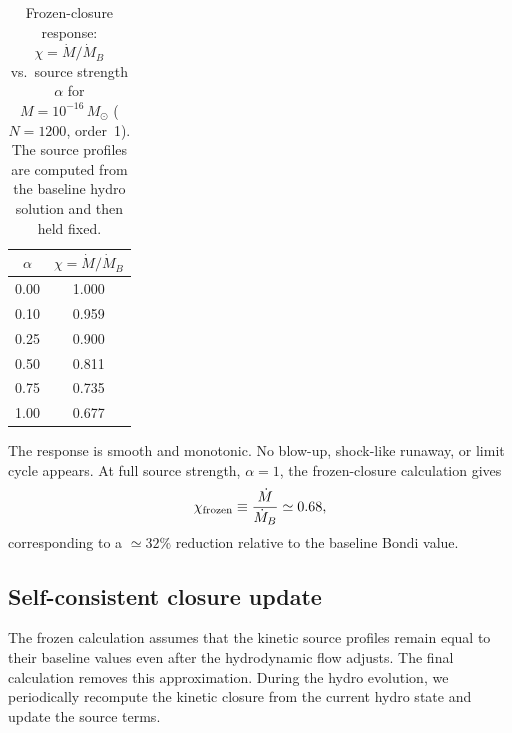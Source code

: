 \documentclass[12pt]{article}
\newcommand{\Msun}{M_\odot}
\newcommand{\Mdot}{\dot{M}}
\newcommand{\MdotB}{\dot{M}_B}
\begin{document}
\begin{table}[h]
\centering
\caption{Frozen-closure response: $\chi = \Mdot/\MdotB$ vs.\ source
  strength $\alpha$ for $M = 10^{-16}\,\Msun$ ($N=1200$, order~1).
  The source profiles are computed from the baseline hydro solution
  and then held fixed.}
\label{tab:alpha}
\begin{tabular}{cc}
\toprule
$\alpha$ & $\chi = \Mdot/\MdotB$ \\
\midrule
0.00 & 1.000 \\
0.10 & 0.959 \\
0.25 & 0.900 \\
0.50 & 0.811 \\
0.75 & 0.735 \\
1.00 & 0.677 \\
\bottomrule
\end{tabular}
\end{table}

The response is smooth and monotonic. No blow-up, shock-like runaway,
or limit cycle appears. At full source strength, $\alpha=1$, the
frozen-closure calculation gives
\begin{equation}
  \chi_{\rm frozen}
  \equiv
  \frac{\Mdot}{\MdotB}
  \simeq 0.68,
  \label{eq:chi_frozen}
\end{equation}
corresponding to a $\simeq 32\%$ reduction relative to the baseline
Bondi value.

\subsection{Self-consistent closure update}

The frozen calculation assumes that the kinetic source profiles remain
equal to their baseline values even after the hydrodynamic flow adjusts.
The final calculation removes this approximation. During the hydro
evolution, we periodically recompute the kinetic closure from the
current hydro state and update the source terms.
\end{document}
